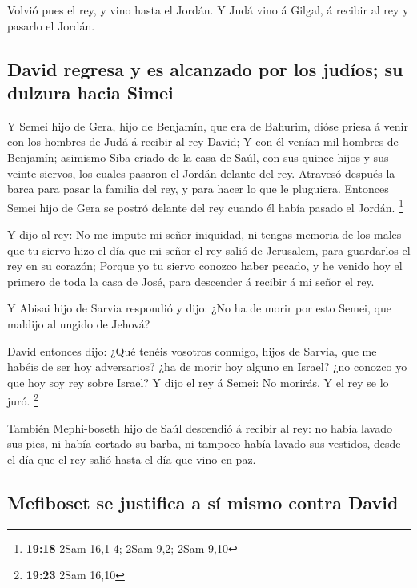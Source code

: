  Volvió pues el rey, y vino hasta el Jordán. Y Judá vino á
Gilgal, á recibir al rey y pasarlo el Jordán.

\hypertarget{david-regresa-y-es-alcanzado-por-los-juduxedos-su-dulzura-hacia-simei}{%
\subsection{David regresa y es alcanzado por los judíos; su dulzura
hacia
Simei}\label{david-regresa-y-es-alcanzado-por-los-juduxedos-su-dulzura-hacia-simei}}

 Y Semei hijo de Gera, hijo de Benjamín, que era de
Bahurim, dióse priesa á venir con los hombres de Judá á recibir al rey
David;  Y con él venían mil hombres de Benjamín; asimismo
Siba criado de la casa de Saúl, con sus quince hijos y sus veinte
siervos, los cuales pasaron el Jordán delante del rey. 
Atravesó después la barca para pasar la familia del rey, y para hacer lo
que le pluguiera. Entonces Semei hijo de Gera se postró delante del rey
cuando él había pasado el Jordán. \footnote{\textbf{19:18} 2Sam 16,1-4;
  2Sam 9,2; 2Sam 9,10}

 Y dijo al rey: No me impute mi señor iniquidad, ni tengas
memoria de los males que tu siervo hizo el día que mi señor el rey salió
de Jerusalem, para guardarlos el rey en su corazón;  Porque
yo tu siervo conozco haber pecado, y he venido hoy el primero de toda la
casa de José, para descender á recibir á mi señor el rey.

 Y Abisai hijo de Sarvia respondió y dijo: ¿No ha de morir
por esto Semei, que maldijo al ungido de Jehová?

 David entonces dijo: ¿Qué tenéis vosotros conmigo, hijos
de Sarvia, que me habéis de ser hoy adversarios? ¿ha de morir hoy alguno
en Israel? ¿no conozco yo que hoy soy rey sobre Israel?  Y
dijo el rey á Semei: No morirás. Y el rey se lo juró. \footnote{\textbf{19:23}
  2Sam 16,10}

 También Mephi-boseth hijo de Saúl descendió á recibir al
rey: no había lavado sus pies, ni había cortado su barba, ni tampoco
había lavado sus vestidos, desde el día que el rey salió hasta el día
que vino en paz.

\hypertarget{mefiboset-se-justifica-a-suxed-mismo-contra-david}{%
\subsection{Mefiboset se justifica a sí mismo contra
David}\label{mefiboset-se-justifica-a-suxed-mismo-contra-david}}

